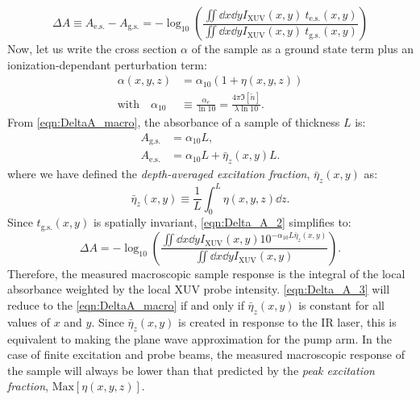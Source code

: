 \begin{equation}
\Delta A \equiv A_{\textrm{e.s.}} - A_{\textrm{g.s.}} = - \log_{10} \left( \frac{\iint \dd{x} \dd{y} I_{\textrm{XUV}}(x,y) \ t_{\textrm{e.s.}}(x,y)}{\iint \dd{x} \dd{y} I_{\textrm{XUV}}(x,y) \ t_{\textrm{g.s.}}(x,y)} \right)
\label{eqn:Delta_A_2}
\end{equation}
Now, let us write the cross section $\alpha$ of the sample as a ground state term plus an ionization-dependant perturbation term:
\begin{equation}
\begin{aligned}
\alpha(x,y,z) &= \alpha_{10} (1 + \eta(x,y,z)) \\
\textrm{with} \quad \alpha_{10} &\equiv \frac{\alpha_e}{\ln 10} = \frac{4 \pi \Im [\tilde{n}]}{\lambda \ln 10}.
\end{aligned}
\end{equation}
From \cref{eqn:DeltaA_macro}, the absorbance of a sample of thickness $L$ is:
\begin{equation}
\begin{aligned}
A_{\textrm{g.s.}} &= \alpha_{10} L, \\
A_{\textrm{e.s.}} &= \alpha_{10} L + \bar{\eta}_z(x,y) L.
\end{aligned}
\end{equation}
where we have defined the \textit{depth-averaged excitation fraction}, $\bar{\eta}_z(x,y)$ as:
\begin{equation}
\bar{\eta}_z(x,y) \equiv \frac{1}{L} \int_{0}^{L} \eta(x,y,z) \dd{z}.
\label{eqn:eta_z}
\end{equation}
Since $t_{\textrm{g.s.}}(x,y)$ is spatially invariant, \cref{eqn:Delta_A_2} simplifies to:
\begin{equation}
\Delta A = -\log_{10} \left( \frac{ \iint \dd{x} \dd{y} I_{\textrm{XUV}}(x,y) 10^{- \alpha_{10} L \bar{\eta}_z(x,y)}}{ \iint \dd{x} \dd{y} I_{\textrm{XUV}}(x,y)} \right).
\label{eqn:Delta_A_3}
\end{equation}
Therefore, the measured macroscopic sample response is the integral of the local absorbance weighted by the local XUV probe intensity. \cref{eqn:Delta_A_3} will reduce to the \cref{eqn:DeltaA_macro} if and only if $\bar{\eta}_z(x,y)$ is constant for all values of $x$ and $y$. Since $\bar{\eta}_z(x,y)$ is created in response to the IR laser, this is equivalent to making the plane wave approximation for the pump arm. In the case of finite excitation and probe beams, the measured macroscopic response of the sample will always be lower than that predicted by the \textit{peak excitation fraction}, $\textrm{Max}[\eta(x,y,z)]$. 

